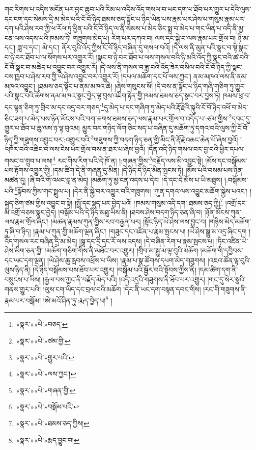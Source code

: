 གང་རིགས་པ་འདིས་མངོན་པར་བྱང་ཆུབ་པའི་རིམ་པ་འདིས་འོད་གསལ་བ་ཡང་དག་པ་ཐོབ་པར་གྱུར་པ་དེའི་ལུས་དང་ངག་དང་སེམས་དྲི་མ་མེད་པའི་ངོ་བོ་ཉིད་ཐམས་ཅད་སྟོང་པ་ཉིད་ཡིན་པས་རྣམ་པར་ཤེས་པ་གསུམ་རྣམ་པར་དག་པའི་ཤེས་རབ་ཀྱི་ཕ་རོལ་ཏུ་ཕྱིན་པའི་ངོ་བོ་ཉིད་ལ་ནི་སེམས་པ་མེད་ཅིང་སྨྲ་བ་མེད་པ་གང་ཡིན་པ་འདི་ནི་མྱ་ངན་ལས་འདས་པའི་ཁམས་ཏེ། གཟུགས་མེད་པ། རེག་པར་དཀའ་བ། ལས་དང་སྐྱེ་བ་ལས་རྣམ་པར་གྲོལ་བ། ཉི་མ་དང་། ཟླ་བ་དང་། མེ་དང་། ནོར་བུའི་འོད་ཀྱིས་ངོ་བོ་ཉིད་བཞིན་དུ་གསལ་བའོ། །དེ་ལས་ནི་མུན་པའི་སྣང་བ་སྟེ་སྣང་བ་ཉེ་བར་ཐོབ་པ་ལ་སོགས་པར་འགྱུར་རོ། །སྣང་བ་ཉེ་བར་ཐོབ་པ་ལས་གསལ་བའི་ཉི་མའི་འོད་ཀྱི་སྣང་བའི་ཚ་བའི་ངོ་བོ་སྣང་བ་མཆེད་པ་འབྱུང་བར་འགྱུར་རོ། །དེ་ལས་ནི་གསལ་བ་ཟླ་བའི་འོད་ཟེར་བསིལ་བའི་ངོ་བོ་ཉིད་ཀྱི་སྣང་བས་ཁྱབ་པ་ཤེས་རབ་ཀྱི་ཡེ་ཤེས་འབྱུང་བར་འགྱུར་རོ། །དཔལ་མཆོག་དང་པོ་ལས་ཀྱང་། ནམ་མཁའ་ལས་ནི་ནམ་མཁའ་འབྱུང་། །ཐམས་ཅད་སྟོང་པ་ནམ་མཁའ་ཆེ། །ཞེས་གསུངས་སོ། །དེ་བས་ན་སྟོང་པ་ཉིད་གཞི་གཅིག་ཏུ་གྱུར་པའི་སྣང་བའི་ཚོགས་ནམ་མཁའ་སྣང་བྱེད་ལྟ་བུས་འཇིག་རྟེན་གྱི་ཁམས་ཐམས་ཅད་སྣང་བར་བྱས་ཏེ། ཁམས་ཕྲ་བ་དང་ལྷན་ཅིག་ཏུ་གྲིབ་མ་དང་འདྲ་བར་གཅད་\footnote{«སྣར་»«པེ་»བཅད་}དུ་མེད་པ་དང་གཞིག་ཏུ་མེད་པའི་རྡོ་རྗེའི་སྐུའི་ངོ་བོ་ཉིད་འཕོ་བ་མེད་ཅིང་ཟག་པ་མེད་པས་ཉོན་མོངས་པའི་བག་ཆགས་ཐམས་ཅད་ལས་རྣམ་པར་གྲོལ་བ་འདོད་པ་:ཙམ་གྱིས་\footnote{«སྣར་»«པེ་»ཙམ་གྱི་}དབང་དུ་གྱུར་པ་ཐོབ་པ་ཆུ་ལས་ཉ་ལྟ་བུའམ། མྱུར་བར་གཉིད་ལོག་ཅིང་སད་པ་བཞིན་དུ་མཆོག་ཏུ་དགའ་བའི་ལུས་ཀྱི་ངོ་བོ་ཉིད་ཀྱི་གཟུགས་འབྱུང་བར་:འགྱུར་བའི་\footnote{«སྣར་»«པེ་»གྱུར་པའི་}གཟུགས་ཀྱི་བདག་ཉིད་ཅན་གྱི་མིང་ནི་རྡོ་རྗེ་འཆང་ཆེན་པོ་ཞེས་བྱའོ། །འཁོར་བའི་འཆིང་བ་ལས་ངེས་པར་གྲོལ་བས་ན་ཐར་པ་ཞེས་བྱའོ། །དོན་འདི་ཉིད་གསལ་བར་བྱ་བའི་ཕྱིར་དཔལ་གསང་བ་གྲུབ་པ་ལས།\footnote{«སྣར་»«པེ་»ལས་ཀྱང་།} རང་གིས་རིག་པའི་དེ་ཁོ་ན། །:གཞན་གྱིས་\footnote{«སྣར་»«པེ་»གཞན་གྱི་}བརྗོད་ལས་མི་འབྱུང་སྟེ། །མོས་དང་བསྒོམས་པས་རྟོགས་འགྱུར་གྱི། །དམ་ཚིག་དེ་ནི་གཞན་དུ་མིན། །དེ་ཉིད་དེ་ཉིད་མིན་སྤངས་ཏེ། །མོས་པའི་བསམ་པས་ཉིན་མཚན་དུ། །ཞི་བའི་གོ་འཕང་བླ་ན་མེད། །མཆོག་ཏུ་མྱ་ངན་འདས་པ་དེར། །དེ་དང་དེ་མོས་པ་ཡི་མཐུས། །:བསྒོམས་པའི་\footnote{«སྣར་»«པེ་»བསྒོམ་པའི་}སྟོབས་ཀྱིས་གང་སྤྲུལ་པ། །དེར་ནི་སྐྱེ་བར་འགྱུར་བའི་གཟུགས། །ཀུན་དགའ་ལས་འབྱུང་མཆོག་སྐྱེས་པའང་། །སྐད་ཅིག་ཙམ་གྱིས་འབྱུང་བ་སྟེ། །སྤྲོ་དང་སྡུད་པར་བྱེད་པའོ། །ཁམས་གསུམ་འདི་དག་:ཐམས་ཅད་ཀྱི།\footnote{«སྣར་»«པེ་»ཐམས་ཅད་ཀྱིས།} །འགྲོ་དང་མི་འགྲོ་བཅས་སྣང་བྱེད། །བསྒོམ་པའི་དེ་ཉིད་མཐུ་ཡིས་ནི། །ཐབས་ཤེས་བདག་ཉིད་ཅན་ཞི་བ། །ཉོན་མོངས་ཀུན་ལས་རྣམ་གྲོལ་ཞིང་། །མཚན་རྣམས་ཀུན་གྱིས་རབ་བརྒྱན་པར། །སྟོང་ཉིད་ཡེ་ཤེས་ལས་བྱུང་བ། །གཉིས་མེད་མཆོག་ཏུ་ཞི་བ་ཉིད། །རྣམ་པ་ཀུན་གྱི་མཆོག་ལྡན་ཞིང་། །གཟུང་དང་འཛིན་པ་རྣམ་སྤངས་པ། །ཡེ་ཤེས་སྒྱུ་མ་འདྲ་ཞིང་དག །འོད་གསལ་རང་བཞིན་དྲི་མ་མེད། །སྒྲ་དང་དྲི་དང་རོ་ལས་འདས། །དེ་བཞིན་རེག་པ་རྣམ་སྤངས་པ། །ཏིང་འཛིན་ཡེ་ཤེས་མིག་ཅན་གྱི། །མཆོག་གཅིག་གིས་ནི་མཐོང་བར་འགྱུར། །གྲིབ་མ་སྒྱུ་མ་ལྟ་བུའི་མཆོག །མཆོག་གི་དབྱིབས་དང་ཡང་དག་ལྡན། །ཡེ་ཤེས་ཆུ་རླབས་འཕྲོས་པ་ཡིས། །རྣམ་པ་སྣ་ཚོགས་དཔག་མེད་གཟུགས། །འཇའ་ཚོན་ལྟ་བུའི་ལུས་ཉིད་ནི། །དེ་ཉིད་བསྒོམས་པས་ཐོབ་པར་འགྱུར། །བསྒོམ་པའི་སྦྱོར་བའི་སྟོབས་ཀྱིས་ནི། །དམ་ཚིག་དག་ནི་བསྲུངས་པ་ཡིས། །རྒྱལ་བས་ཀྱང་ནི་བརྗོད་མེད་པའི། །འདི་འདྲའི་གཟུགས་ནི་ཐོབ་པར་འགྱུར། །གང་དུ་སེར་སྣའི་གནས་གྱུར་པའི། །ལུས་ངག་ཡིད་དང་བྲལ་བའི་མཆོག །དེར་ནི་ཡང་དག་བསྟན་དབང་གིས། །རང་གི་གཟུགས་ནི་རྣམ་པར་བསྒོམ། །ཨེ་མའོ་ཤིན་ཏུ་:རྨད་བྱེད་པ།\footnote{«སྣར་»«པེ་»རྨད་བྱུང་བ།} །
